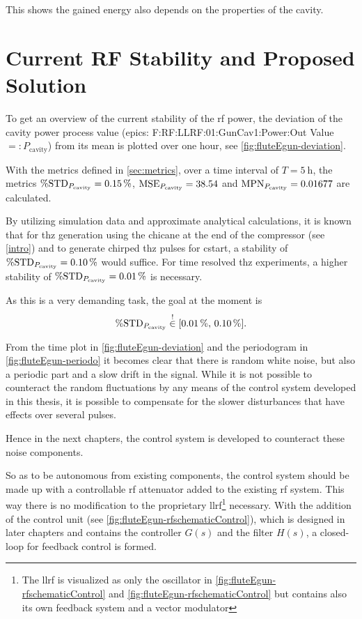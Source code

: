 This shows the gained energy also depends on the properties of the cavity.

\section{Current RF Stability and Proposed Solution}
To get an overview of the current stability of the \gls{rf} power, the deviation of the cavity power process value (\gls{epics}: F:RF:LLRF:01:GunCav1:Power:Out Value $=:P_\text{cavity}$) from its mean is plotted over one hour, see \autoref{fig:fluteEgun-deviation}.

With the metrics defined in \autoref{sec:metrics}, over a time interval of $T=\SI{5}{\hour}$, the metrics $\operatorname{\%STD}_{P_\text{cavity}}=\SI{0.15}{\percent}$, $\operatorname{MSE}_{P_\text{cavity}}=38.54$ and $\operatorname{MPN}_{P_\text{cavity}}=0.01677$ are calculated.

By utilizing simulation data and approximate analytical calculations, it is known that for \gls{thz} generation using the chicane at the end of the compressor (see \autoref{intro}) and to generate chirped \gls{thz} pulses for \gls{cstart}, a stability of $\operatorname{\%STD}_{P_\text{cavity}}=\SI{0.10}{\percent}$ would suffice. For time resolved \gls{thz} experiments, a higher stability of $\operatorname{\%STD}_{P_\text{cavity}}=\SI{0.01}{\percent}$ is necessary. \cite{Nigel2021}

As this is a very demanding task, the goal at the moment is 
\begin{equation}
\operatorname{\%STD}_{P_\text{cavity}} \overset{!}{\in} [\SI{0.01}{\percent},\,\SI{0.10}{\percent}].
\end{equation}


From the time plot in \autoref{fig:fluteEgun-deviation} and the periodogram in \autoref{fig:fluteEgun-periodo} it becomes clear that there is random white noise, but also a periodic part and a slow drift in the signal. While it is not possible to counteract the random fluctuations by any means of the control system developed in this thesis, it is possible to compensate for the slower disturbances that have effects over several pulses.

Hence in the next chapters, the control system is developed to counteract these noise components. 

So as to be autonomous from existing components, the control system should be made up with a controllable \gls{rf} attenuator added to the existing \gls{rf} system. This way there is no modification to the proprietary \gls{llrf}\footnote{The \gls{llrf} is visualized as only the oscillator in \autoref{fig:fluteEgun-rfschematicControl} and \autoref{fig:fluteEgun-rfschematicControl} but contains also its own feedback system and a vector modulator} necessary. With the addition of the control unit (see \autoref{fig:fluteEgun-rfschematicControl}), which is designed in later chapters and contains the controller $G(s)$ and the filter $H(s)$, a closed-loop for feedback control is formed.

